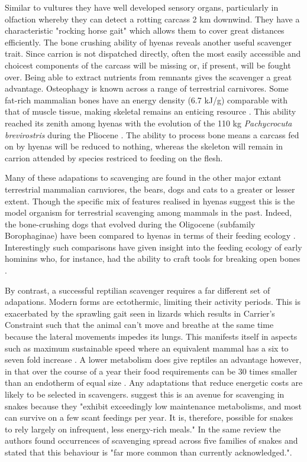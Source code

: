 \documentclass[a4paper,12pt]{article}
\begin{document}
Similar to vultures they have well developed sensory organs, particularly in olfaction whereby they can detect a rotting carcass 2 km downwind. They have a characteristic "rocking horse gait"  which allows them to cover great distances efficiently. The bone crushing ability of hyenas reveals another useful scavenger trait. Since carrion is not dispatched directly, often the most easily accessible and choicest components of the carcass will be missing or, if present, will be fought over. Being able to extract nutrients from remnants gives the scavenger a great advantage. Osteophagy is known across a range of terrestrial carnivores. Some fat-rich mammalian bones have an energy density (6.7 kJ/g) comparable with that of muscle tissue, making skeletal remains an enticing resource \citep{brown1989study}. This ability reached its zenith among hyenas with the evolution of the 110 kg \textit{Pachycrocuta brevirostris} during the Pliocene \citep{palmqvist2011giant}. The ability to process bone means a carcass fed on by hyenas will be reduced to nothing, whereas the skeleton will remain in carrion attended by species restriced to feeding on the flesh. 

Many of these adapations to scavenging are found in the other major extant terrestrial mammalian carnviores, the bears, dogs and cats to a greater or lesser extent. Though the specific mix of features realised in hyenas suggest this is the model organism for terrestrial scavenging among mammals in the past. Indeed, the bone-crushing dogs that evolved during the Oligocene (subfamily Borophaginae) have been compared to hyenas in terms of their feeding ecology \citep{van2003chapter,martin2016pursuit}. Interestingly such comparisons have given insight into the feeding ecology of early hominins who, for instance, had the ability to craft tools for breaking open bones \citep{hone2010feeding,ARCM:ARCM12084}. 

By contrast, a successful reptilian scavenger requires a far different set of adapations. Modern forms are ectothermic, limiting their activity periods. This is exacerbated by the sprawling gait seen in lizards which results in Carrier's Constraint such that the animal can't move and breathe at the same time because the lateral movements impedes its lungs. This manifests itself in aspects such as maximum sustainable speed where an equivalent mammal has a six to seven fold increase \citep{ruben1995evolution}. A lower metabolism does give reptiles an advantage however, in that over the course of a year their food requirements can be 30 times smaller than an endotherm of equal size \citep{Nagy1621}. Any adaptations that reduce energetic costs are likely to be selected in scavengers. \cite{devault2002scavenging} suggest this is an avenue for scavenging in snakes because they "exhibit  exceedingly  low  maintenance  metabolisms,  and most  can  survive  on  a  few  scant  feedings per year. It  is, therefore, possible for snakes to rely largely  on  infrequent,  less  energy-rich  meals." In the same review the authors found occurrences of scavenging spread across five families of snakes and stated that this behaviour is "far more common than currently acknowledged."\citep{devault2002scavenging}. 
\end{document}
